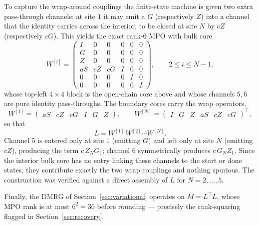 \documentclass[12pt]{article}
\theoremstyle{definition}
\theoremstyle{remark}
\begin{document}
To capture the wrap-around couplings the finite-state machine is given two extra pass-through channels: at site $1$ it may emit a $G$ (respectively $Z$) into a channel that the identity carries across the interior, to be closed at site $N$ by $cZ$ (respectively $cG$). This yields the exact rank-$6$ MPO with bulk core
\[
W^{[i]} =
\begin{pmatrix}
I  & 0   & 0   & 0  & 0 & 0 \\
G  & 0   & 0   & 0  & 0 & 0 \\
Z  & 0   & 0   & 0  & 0 & 0 \\
aS & cZ  & cG  & I  & 0 & 0 \\
0  & 0   & 0   & 0  & I & 0 \\
0  & 0   & 0   & 0  & 0 & I
\end{pmatrix},
\qquad 2 \le i \le N-1,
\]
whose top-left $4\times4$ block is the open-chain core above and whose channels $5, 6$ are pure identity pass-throughs. The boundary cores carry the wrap operators,
\[
W^{[1]} = \begin{pmatrix} aS & cZ & cG & I & G & Z \end{pmatrix},
\qquad
W^{[N]} = \begin{pmatrix} I & G & Z & aS & cZ & cG \end{pmatrix}^{\!\top},
\]
so that
\[
L = W^{[1]}\,W^{[2]} \cdots W^{[N]}.
\]
Channel $5$ is entered only at site $1$ (emitting $G$) and left only at site $N$ (emitting $cZ$), producing the term $c\,Z_N G_1$; channel $6$ symmetrically produces $c\,G_N Z_1$. Since the interior bulk core has no entry linking these channels to the start or done states, they contribute exactly the two wrap couplings and nothing spurious. The construction was verified against a direct assembly of $L$ for $N = 2, \dots, 5$.

Finally, the DMRG of Section~\ref{sec:variational} operates on $M = L^\top L$, whose MPO rank is at most $6^2 = 36$ before rounding --- precisely the rank-squaring flagged in Section~\ref{sec:recovery}.
\end{document}
